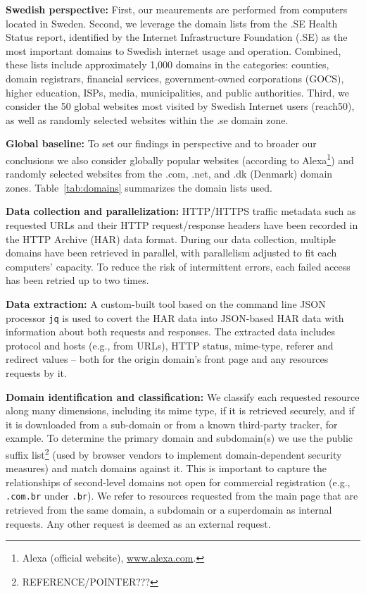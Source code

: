 \documentclass{sig-alternate-10pt}
\begin{document}
{\bf Swedish perspective:}  
First, our meaurements are performed from computers located in Sweden.
Second, we leverage the domain lists from the .SE Health Status report\cite{},
identified by the Internet Infrastructure Foundation (.SE) as the most important domains
to Swedish internet usage and operation.
Combined, these lists include approximately 1,000 domains in the
categories: counties, domain registrars, financial services, government-owned corporations
(GOCS), higher education, ISPs, media, municipalities, and public authorities.
Third, we consider the 50 global websites most visited by Swedish Internet users (reach50),
as well as randomly selected websites within the .se domain zone.

{\bf Global baseline:}  To set our findings in perspective and to broader our
conclusions we also consider globally popular websites (according to Alexa\footnote{
Alexa (official website), \url{www.alexa.com}.}) and randomly selected websites 
from the .com, .net, and .dk (Denmark) domain zones.
Table~\ref{tab:domains} summarizes the domain lists used.

{\bf Data collection and parallelization:}
HTTP/HTTPS traffic metadata such
as requested URLs and their HTTP request/response headers have been recorded in the HTTP
Archive (HAR) data format.
During our data collection,
multiple domains have been retrieved in parallel, 
with parallelism adjusted to fit each computers' capacity. 
To reduce the risk of intermittent errors,
each failed access has been retried up to two times.


{\bf Data extraction:}
A custom-built tool based on the command line JSON processor \texttt{jq}
is used to covert the HAR data into JSON-based HAR data with information about both requests and responses.
The extracted data includes protocol and hosts (e.g., from URLs), 
HTTP status, mime-type, referer and redirect values – both
for the origin domain's front page and any resources requests by it. 

{\bf Domain identification and classification:}
We classify each requested resource along many dimensions, 
including its mime type, if it is retrieved securely,
and if it is downloaded from a sub-domain or from a known third-party tracker, for example. 
To determine the primary domain and subdomain(s) we use the public suffix list\footnote{REFERENCE/POINTER???} 
(used by browser vendors to implement domain-dependent security measures)
and match domains against it.  This is important to capture the relationships
of second-level domains not open for commercial registration (e.g., \texttt{.com.br}
under \texttt{.br}).  
We refer to resources requested from the main page
that are retrieved from the same domain, a subdomain
or a superdomain as internal requests.
Any other request is deemed as an external request.
\end{document}
